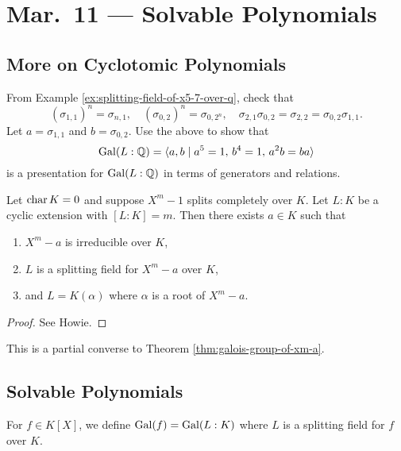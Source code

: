 \chapter{Mar.~11 --- Solvable Polynomials}

\section{More on Cyclotomic Polynomials}
\begin{exercise}
  From Example \ref{ex:splitting-field-of-x5-7-over-q},
  check that
  \[
    (\sigma_{1, 1})^n = \sigma_{n, 1}, \quad
    (\sigma_{0, 2})^n = \sigma_{0, 2^n}, \quad
    \sigma_{2, 1} \sigma_{0, 2} = \sigma_{2, 2} = \sigma_{0, 2} \sigma_{1, 1}.
  \]
  Let $a = \sigma_{1, 1}$ and $b = \sigma_{0, 2}$. Use
  the above to show that
  \[
    \operatorname{Gal}(L : \mathbb{Q}) = \langle a, b \mid a^5 = 1,\, b^4 = 1,\, a^2 b = ba \rangle
  \]
  is a presentation for $\operatorname{Gal}(L : \mathbb{Q})$
  in terms of generators and relations.
\end{exercise}

\begin{theorem}
  \label{thm:char-zero-cyclic-converse}
  Let $\operatorname{char} K = 0$ and suppose $X^m - 1$ splits
  completely over $K$. Let $L : K$ be a cyclic extension
  with $[L : K] = m$. Then there exists $a \in K$ such
  that
  \begin{enumerate}
    \item $X^m - a$ is irreducible over $K$,
    \item $L$ is a splitting field for $X^m - a$ over $K$,
    \item and $L = K(\alpha)$ where $\alpha$ is a root of
      $X^m - a$.
  \end{enumerate}
\end{theorem}

\begin{proof}
  See Howie.
\end{proof}

\begin{remark}
  This is a partial converse to Theorem
  \ref{thm:galois-group-of-xm-a}.
\end{remark}

\section{Solvable Polynomials}

\begin{remark}
  For $f \in K[X]$, we define
  $\operatorname{Gal}(f) = \operatorname{Gal}(L : K)$ where $L$ is a splitting
  field for $f$ over $K$.
\end{remark}


